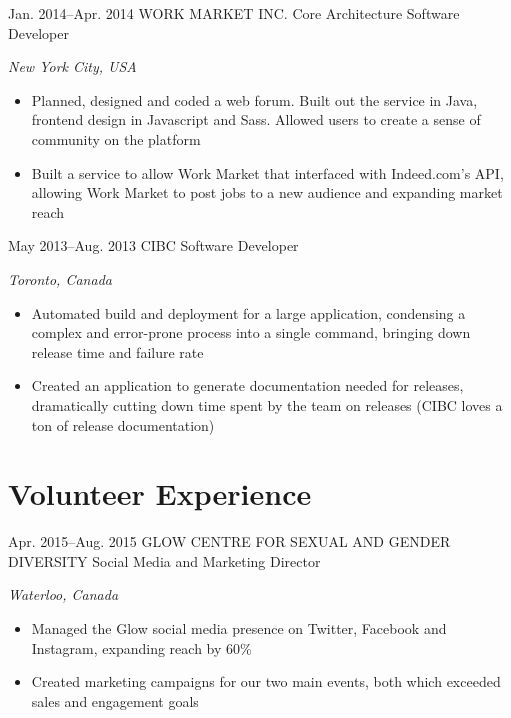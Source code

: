\documentclass{resume-class}
\begin{document}
\begin{sectionlist}
	\entry
	{Jan. 2014--Apr. 2014}
	{WORK MARKET INC.}
	{Core Architecture Software Developer}
	{\emph {New York City, USA}\\
		\begin{itemize}
		    \setlength{\itemsep}{0.2em}
			\item Planned, designed and coded a web forum. Built out the service in Java, frontend design in Javascript and Sass. Allowed users to create a sense of community on the platform
			\item Built a service to allow Work Market that interfaced with Indeed.com's API, allowing Work Market to post jobs to a new audience and expanding market reach
		\end{itemize}
	}
	
	\entry
	{May 2013--Aug. 2013}
	{CIBC}
	{Software Developer}
	{\emph {Toronto, Canada} \\
		\begin{itemize}
		    \setlength{\itemsep}{0.2em}
			\item Automated build and deployment for a large application, condensing a complex and error-prone process into a single command, bringing down release time and failure rate
			\item Created an application to generate documentation needed for releases,\\dramatically cutting down time spent by the team on releases (CIBC loves a ton of release documentation)
		\end{itemize}
	}
	
\end{sectionlist}



\vspace{-2.5\parskip}
\section{Volunteer Experience}


\begin{sectionlist}
	
	\entry
	{Apr. 2015--Aug. 2015}
	{GLOW CENTRE FOR SEXUAL AND GENDER DIVERSITY}
	{Social Media and Marketing Director}
	{\emph{Waterloo, Canada} \\
		\begin{itemize}
		    \setlength{\itemsep}{0.2em}
			\item Managed the Glow social media presence on Twitter, Facebook and Instagram, expanding reach by 60\%
			\item Created marketing campaigns for our two main events, both which exceeded sales and engagement goals
		\end{itemize}
	}

\end{sectionlist}
\end{document}
